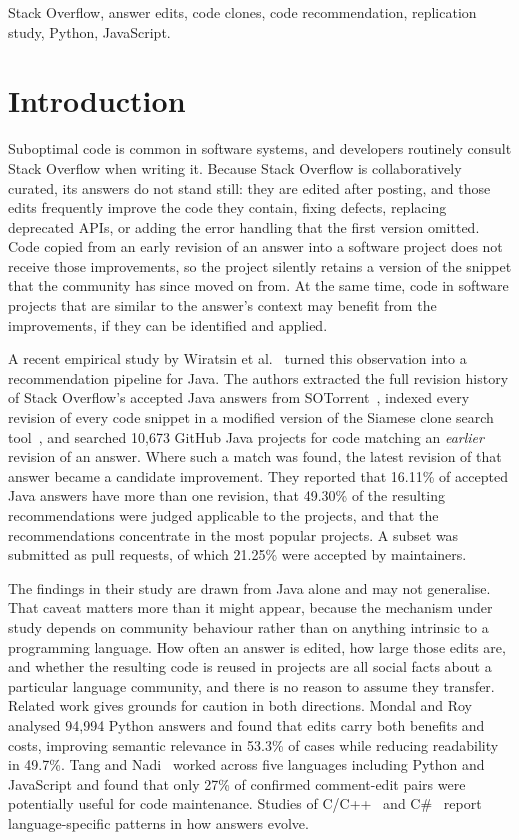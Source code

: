 \documentclass[onecolumn,11pt]{IEEEtran}
\begin{document}
\begin{IEEEkeywords}
Stack Overflow, answer edits, code clones, code recommendation, replication study,
Python, JavaScript.
\end{IEEEkeywords}

\section{Introduction}

Suboptimal code is common in software systems, and developers routinely consult Stack Overflow when writing it.
Because Stack Overflow is collaboratively curated, its answers do not stand still: they are edited after posting, and those edits frequently improve the code they contain, fixing defects, replacing deprecated APIs, or adding the error handling that the first version omitted.
Code copied from an early revision of an answer into a software project does not receive those improvements, so the project silently retains a version of the snippet that the community has since moved on from.
At the same time, code in software projects that are similar to the answer's context may benefit from the improvements, if they can be identified and applied.

A recent empirical study by Wiratsin et al.~\cite{wiratsin2025java} turned this observation into a recommendation pipeline for Java.
The authors extracted the full revision history of Stack Overflow's accepted Java answers from SOTorrent~\cite{baltes2018sotorrent}, indexed every revision of every code snippet in a modified version of the Siamese clone search tool~\cite{ragkhitwetsagul2019siamese}, and searched 10{,}673 GitHub Java projects for code matching an \emph{earlier} revision of an answer.
Where such a match was found, the latest revision of that answer became a candidate improvement.
They reported that 16.11\% of accepted Java answers have more than one revision, that 49.30\% of the resulting recommendations were judged applicable to the projects, and that the recommendations concentrate in the most popular projects.
A subset was submitted as pull requests, of which 21.25\% were accepted by maintainers.

The findings in their study are drawn from Java alone and may not generalise.
That caveat matters more than it might appear, because the mechanism under study depends on community behaviour rather than on anything intrinsic to a programming language.
How often an answer is edited, how large those edits are, and whether the resulting code is reused in projects are all social facts about a particular language community, and there is no reason to assume they transfer.
Related work gives grounds for caution in both directions.
Mondal and Roy~\cite{mondal2025editing} analysed 94{,}994 Python answers and found that edits carry both benefits and costs, improving semantic relevance in 53.3\% of cases while reducing readability in 49.7\%.
Tang and Nadi~\cite{tang2021comment} worked across five languages including Python and JavaScript and found that only 27\% of confirmed comment-edit pairs were potentially useful for code maintenance.
Studies of C/C++~\cite{zhang2022cweaknesses} and C\#~\cite{zuo2025security} report language-specific patterns in how answers evolve.
\end{document}
